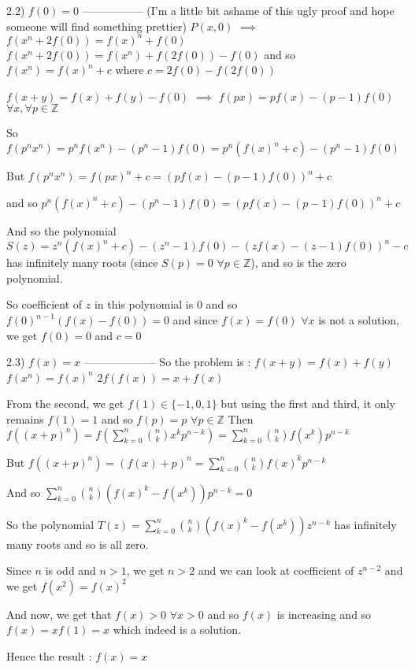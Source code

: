 \begin{solution}
2.2) $f(0)=0$
-----------------
(I'm a little bit ashame of this ugly proof and hope someone will find something prettier)
$P(x,0)$ $\implies$ $f(x^n+2f(0))=f(x)^n+f(0)$
$f(x^n+2f(0))=f(x^n)+f(2f(0))-f(0)$ and so $f(x^n)=f(x)^n+c$ where $c=2f(0)-f(2f(0))$

$f(x+y)=f(x)+f(y)-f(0)$ $\implies$ $f(px)=pf(x)-(p-1)f(0)$ $\forall x,\forall p\in\mathbb Z$

So $f(p^nx^n)=p^nf(x^n)-(p^n-1)f(0)=p^n(f(x)^n+c)-(p^n-1)f(0)$

But $f(p^nx^n)=f(px)^n+c=(pf(x)-(p-1)f(0))^n+c$

and so $p^n(f(x)^n+c)-(p^n-1)f(0)=(pf(x)-(p-1)f(0))^n+c$

And so the polynomial $S(z)=z^n(f(x)^n+c)-(z^n-1)f(0)-(zf(x)-(z-1)f(0))^n-c$ has infinitely many roots (since $S(p)=0$ $\forall p\in\mathbb Z$), and so is the zero polynomial.

So coefficient of $z$ in this polynomial is 0 and so $f(0)^{n-1}(f(x)-f(0))=0$ and since $f(x)=f(0)$ $\forall x$ is not a solution, we get $f(0)=0$ and $c=0$

2.3) $f(x)=x$
--------------------
So the problem is :
$f(x+y)=f(x)+f(y)$
$f(x^n)=f(x)^n$
$2f(f(x))=x+f(x)$

From the second, we get $f(1)\in\{-1,0,1\}$ but using the first and third, it only remains $f(1)=1$ and so $f(p)=p$ $\forall p\in\mathbb Z$
Then $f((x+p)^n)=f(\sum_{k=0}^n\binom nkx^kp^{n-k})=\sum_{k=0}^n\binom nkf(x^k)p^{n-k}$

But $f((x+p)^n)=(f(x)+p)^n=\sum_{k=0}^n\binom nkf(x)^kp^{n-k}$

And so $\sum_{k=0}^n\binom nk(f(x)^k-f(x^k))p^{n-k}=0$

So the polynomial $T(z)=\sum_{k=0}^n\binom nk(f(x)^k-f(x^k))z^{n-k}$ has infinitely many roots and so is all zero.

Since $n$ is odd and $n>1$, we get $n>2$ and we can look at coefficient of $z^{n-2}$ and we get $f(x^2)=f(x)^2$

And now, we get that $f(x)>0$ $\forall x>0$ and so $f(x)$ is increasing and so $f(x)=xf(1)=x$ which indeed is a solution.

Hence the result : $\boxed{f(x)=x}$
\end{solution}



